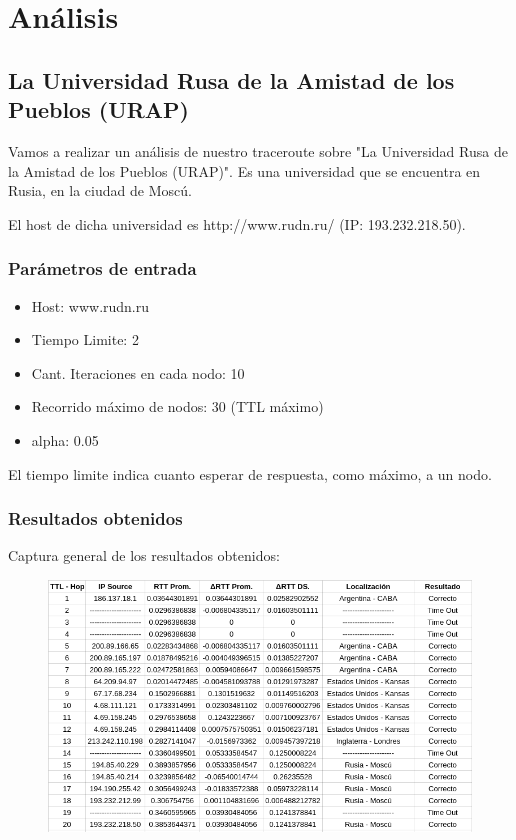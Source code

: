 \section{An\'alisis}

\subsection{La Universidad Rusa de la Amistad de los Pueblos (URAP)}
Vamos a realizar un an\'alisis de nuestro traceroute sobre "La Universidad Rusa de la Amistad de los Pueblos (URAP)". Es una universidad que se encuentra en Rusia, en la ciudad de Mosc\'u.\newline

El host de dicha universidad es http://www.rudn.ru/ (IP: 193.232.218.50).\\	

\subsubsection{Par\'ametros de entrada}
\begin{itemize}
\item Host: www.rudn.ru
\item Tiempo Limite: 2
\item Cant. Iteraciones en cada nodo: 10
\item Recorrido m\'aximo de nodos: 30 (TTL m\'aximo)
\item alpha: 0.05
\end{itemize}
El tiempo limite indica cuanto esperar de respuesta, como m\'aximo, a un nodo.\newline

\subsubsection{Resultados obtenidos}

Captura general de los resultados obtenidos:

\begin{figure}[h]
    \includegraphics[width=1\textwidth]{img_analisis1/tabla.png}
    
\end{figure}
\vspace{0.25cm}

